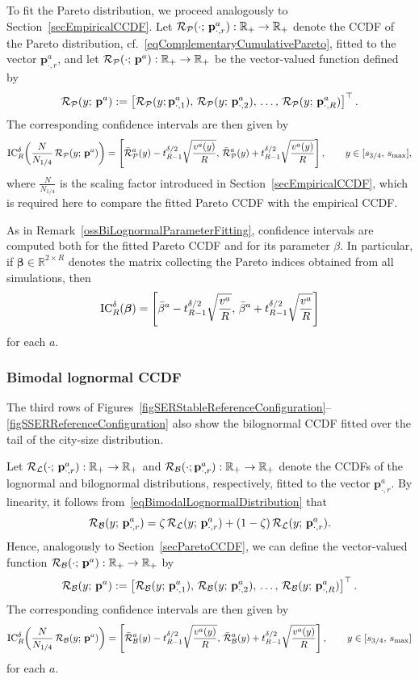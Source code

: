\documentclass[a4paper]{article}
\newcommand{\R}{\mathbb{R}}
\begin{document}
To fit the Pareto distribution, we proceed analogously to Section~\ref{secEmpiricalCCDF}. Let $\CCDF_{\mathcal P}(\cdot;\,\mathbf p^a_{\cdot,r}):\R_+\to\R_+$ denote the CCDF of the Pareto distribution, cf.~\eqref{eqComplementaryCumulativePareto}, fitted to the vector $\mathbf p^a_{\cdot,r}$, and let $\CCDF_{\mathcal P}(\cdot;\,\mathbf p^a):\R_+\to\R_+$ be the vector-valued function defined by
$$ \operatorname{\mathcal R}_{\mathcal P}(y;\,\mathbf p^a):=
    \left[\operatorname{\mathcal R}_{\mathcal P}(y;\mathbf p^a_{\cdot,1}),\,\operatorname{\mathcal R}_{\mathcal P}(y;\,\mathbf p^a_{\cdot,2}),\,\dots,\,\operatorname{\mathcal R}_{\mathcal P}(y;\,\mathbf p^a_{\cdot,R})\right]^\top. $$
The corresponding confidence intervals are then given by
$$ \operatorname{IC}_R^{\delta}\!\left(\frac{N}{N_{1/4}}\operatorname{\mathcal R}_{\mathcal P}(y;\,\mathbf p^a)\right)
    =\left[\bar{\operatorname{\mathcal R}}_{\mathcal P}^a(y)-t^{\delta/2}_{R-1}\sqrt{\frac{v^a(y)}{R}},\,\bar{\operatorname{\mathcal R}}_{\mathcal P}^a(y)+t^{\delta/2}_{R-1}\sqrt{\frac{v^a(y)}{R}}\right],
    \qquad y\in [s_{3/4},\,s_{\max}], $$
where $\frac{N}{N_{1/4}}$ is the scaling factor introduced in Section~\ref{secEmpiricalCCDF}, which is required here to compare the fitted Pareto CCDF with the empirical CCDF.

As in Remark~\ref{ossBiLognormalParameterFitting}, confidence intervals are computed both for the fitted Pareto CCDF and for its parameter $\beta$. In particular, if $\boldsymbol\beta\in\R^{2\times R}$ denotes the matrix collecting the Pareto indices obtained from all simulations, then
$$ \operatorname{IC}_R^\delta(\boldsymbol\beta)=\left[\bar\beta^a-t^{\delta/2}_{R-1}\sqrt{\frac{v^a}{R}},\,\bar\beta^a+t^{\delta/2}_{R-1}\sqrt{\frac{v^a}{R}}\right] $$
for each $a$.
        
\subsubsection{Bimodal lognormal CCDF}
The third rows of Figures~\ref{figSERStableReferenceConfiguration}--\ref{figSSERReferenceConfiguration} also show the bilognormal CCDF fitted over the tail of the city-size distribution.

Let $\CCDF_{\mathcal L}(\cdot;\,\mathbf p^a_{\cdot,r}):\R_+\to\R_+$ and $\CCDF_{\mathcal B}(\cdot;\mathbf p^a_{\cdot,r}):\R_+\to\R_+$ denote the CCDFs of the lognormal and bilognormal distributions, respectively, fitted to the vector $\mathbf p^a_{\cdot,r}$. By linearity, it follows from~\eqref{eqBimodalLognormalDistribution} that
$$ \operatorname{\mathcal R}_{\mathcal B}(y;\,\mathbf p^a_{\cdot,r})=\zeta\operatorname{\mathcal R}_{\mathcal L}(y;\,\mathbf p^a_{\cdot,r})
    +(1-\zeta)\operatorname{\mathcal R}_{\mathcal L}(y;\,\mathbf p^a_{\cdot,r}). $$
Hence, analogously to Section~\ref{secParetoCCDF}, we can define the vector-valued function $\CCDF_{\mathcal B}(\cdot;\,\mathbf p^a):\R_+\to\R_+$ by
$$ \operatorname{\mathcal R}_{\mathcal B}(y;\,\mathbf p^a):=
    \left[\operatorname{\mathcal R}_{\mathcal B}(y;\,\mathbf p^a_{\cdot,1}),\,\operatorname{\mathcal R}_{\mathcal B}(y;\,\mathbf p^a_{\cdot,2}),\,\dots,\,\operatorname{\mathcal R}_{\mathcal B}(y;\,\mathbf p^a_{\cdot,R})\right]^\top. $$
The corresponding confidence intervals are then given by
$$ \operatorname{IC}_R^{\delta}\!\left(\frac{N}{N_{1/4}}\operatorname{\mathcal R}_{\mathcal B}(y;\,\mathbf p^a)\right)
    =\left[\bar{\operatorname{\mathcal R}}_{\mathcal B}^a(y)-t^{\delta/2}_{R-1}\sqrt{\frac{v^a(y)}{R}},\,
        \bar{\operatorname{\mathcal R}}_{\mathcal B}^a(y)+t^{\delta/2}_{R-1}\sqrt{\frac{v^a(y)}{R}}\right],
            \qquad y\in [s_{3/4},\,s_{\max}] $$
for each $a$.
        
\end{document}
